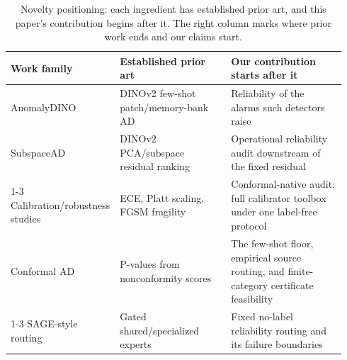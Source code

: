 \begin{table}[pos=t]
\centering
\caption{Novelty positioning: each ingredient has established prior art, and this paper's contribution begins after it. The right column marks where prior work ends and our claims start.}
\label{tab:prior-positioning}
\footnotesize
\setlength{\tabcolsep}{3pt}
\begin{tabular}{p{0.24\linewidth}p{0.34\linewidth}p{0.36\linewidth}}
\toprule
Work family & Established prior art & Our contribution starts after it \\
\midrule
AnomalyDINO & DINOv2 few-shot patch/memory-bank AD & Reliability of the alarms such detectors raise \\
SubspaceAD & DINOv2 PCA/subspace residual ranking & Operational reliability audit downstream of the fixed residual \\
\cmidrule(lr){1-3}
Calibration/robustness studies & ECE, Platt scaling, FGSM fragility & Conformal-native audit; full calibrator toolbox under one label-free protocol \\
Conformal AD & P-values from nonconformity scores & The few-shot floor, empirical source routing, and finite-category certificate feasibility \\
\cmidrule(lr){1-3}
SAGE-style routing & Gated shared/specialized experts & Fixed no-label reliability routing and its failure boundaries \\
\bottomrule
\end{tabular}
\end{table}
